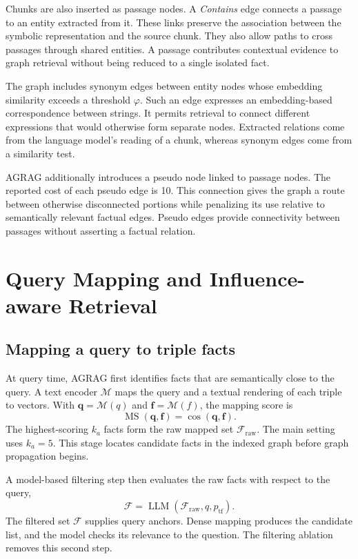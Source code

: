 Chunks are also inserted as passage nodes. A \textit{Contains} edge connects a passage to an entity extracted from it. These links preserve the association between the symbolic representation and the source chunk. They also allow paths to cross passages through shared entities. A passage contributes contextual evidence to graph retrieval without being reduced to a single isolated fact.

The graph includes synonym edges between entity nodes whose embedding similarity exceeds a threshold $\varphi$. Such an edge expresses an embedding-based correspondence between strings. It permits retrieval to connect different expressions that would otherwise form separate nodes. Extracted relations come from the language model's reading of a chunk, whereas synonym edges come from a similarity test.

AGRAG additionally introduces a pseudo node linked to passage nodes. The reported cost of each pseudo edge is 10. This connection gives the graph a route between otherwise disconnected portions while penalizing its use relative to semantically relevant factual edges. Pseudo edges provide connectivity between passages without asserting a factual relation.

\section{Query Mapping and Influence-aware Retrieval}
\label{sec:agrag:influence}
\subsection{Mapping a query to triple facts}
At query time, AGRAG first identifies facts that are semantically close to the query. A text encoder $\mathcal{M}$ maps the query and a textual rendering of each triple to vectors. With $\mathbf{q}=\mathcal{M}(q)$ and $\mathbf{f}=\mathcal{M}(f)$, the mapping score is
\begin{equation}
\operatorname{MS}(\mathbf{q},\mathbf{f})=
\cos(\mathbf{q},\mathbf{f}).
\label{eq:agrag:mapping}
\end{equation}
The highest-scoring $k_a$ facts form the raw mapped set $\mathcal{F}_{\mathrm{raw}}$. The main setting uses $k_a=5$. This stage locates candidate facts in the indexed graph before graph propagation begins.

A model-based filtering step then evaluates the raw facts with respect to the query,
\begin{equation}
\mathcal{F}=\operatorname{LLM}(\mathcal{F}_{\mathrm{raw}},q,p_{\mathrm{tf}}).
\label{eq:agrag:filter}
\end{equation}
The filtered set $\mathcal{F}$ supplies query anchors. Dense mapping produces the candidate list, and the model checks its relevance to the question. The filtering ablation removes this second step.

